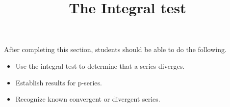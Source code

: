 \documentclass{ximera}
\title{The Integral test}
\begin{document}
\begin{abstract}
\end{abstract}

\maketitle

\begin{sectionOutcomes}

After completing this section, students should be able to do the following.

\begin{itemize}
\item Use the integral test to determine that a series diverges.
\item Establish results for p-series.
\item Recognize known convergent or divergent series.
\end{itemize}

\end{sectionOutcomes}
\end{document}
